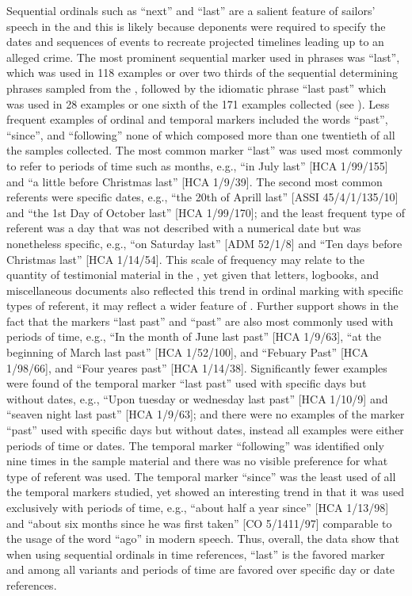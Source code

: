 Sequential ordinals such as “next” and “last” are a salient feature of sailors’ speech in the  and this is likely because deponents were required to specify the dates and sequences of events to recreate projected timelines leading up to an alleged crime. The most prominent sequential marker used in  phrases was “last”, which was used in 118 examples or over two thirds of the sequential determining phrases sampled from the , followed by the idiomatic phrase “last past” which was used in 28 examples or one sixth of the 171 examples collected (see ). Less frequent examples of ordinal and temporal markers included the words “past”, “since”, and “following” none of which composed more than one twentieth of all the samples collected. The most common marker “last” was used most commonly to refer to periods of time such as months, e.g., “in July last” [HCA 1/99/155] and “a little before Christmas last” [HCA 1/9/39]. The second most common referents were specific dates, e.g., “the 20th of Aprill last” [ASSI 45/4/1/135/10] and “the 1st Day of October last” [HCA 1/99/170]; and the least frequent type of referent was a day that was not described with a numerical date but was nonetheless specific, e.g., “on Saturday last” [ADM 52/1/8] and “Ten days before Christmas last” [HCA 1/14/54]. This scale of frequency may relate to the quantity of testimonial material in the , yet given that letters, logbooks, and miscellaneous documents also reflected this trend in ordinal marking with specific types of referent, it may reflect a wider feature of . Further support shows in the fact that the markers “last past” and “past” are also most commonly used with periods of time, e.g., “In the month of June last past” [HCA 1/9/63], “at the beginning of March last past” [HCA 1/52/100], and “Febuary Past” [HCA 1/98/66], and “Four yeares past” [HCA 1/14/38]. Significantly fewer examples were found of the temporal marker “last past” used with specific days but without dates, e.g., “Upon tuesday or wednesday last past” [HCA 1/10/9] and “seaven night last past” [HCA 1/9/63]; and there were no examples of the marker “past” used with specific days but without dates, instead all examples were either periods of time or dates. The temporal marker “following” was identified only nine times in the sample material and there was no visible preference for what type of referent was used. The temporal marker “since” was the least used of all the temporal markers studied, yet showed an interesting trend in that it was used exclusively with periods of time, e.g., “about half a year since” [HCA 1/13/98] and “about six months since he was first taken” [CO 5/1411/97] comparable to the usage of the word “ago” in modern speech. Thus, overall, the data show that when using sequential ordinals in time references, “last” is the favored marker and among all variants and periods of time are favored over specific day or date references. 

